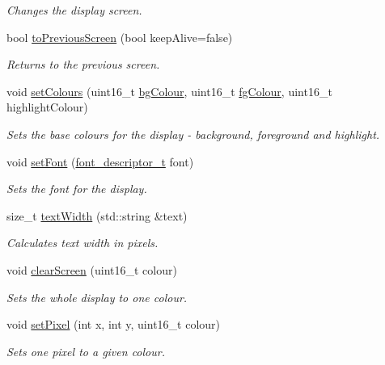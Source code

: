 \begin{DoxyCompactItemize}
\begin{DoxyCompactList}\small\item\em Changes the display screen. \end{DoxyCompactList}\item 
bool \mbox{\hyperlink{classDisplay_ad043404964c19f51bb903da796aaefda}{to\+Previous\+Screen}} (bool keep\+Alive=false)
\begin{DoxyCompactList}\small\item\em Returns to the previous screen. \end{DoxyCompactList}\item 
void \mbox{\hyperlink{classDisplay_a8292ad87dddbf7090e074bcff5968d93}{set\+Colours}} (uint16\+\_\+t \mbox{\hyperlink{classDisplay_a23a0f9867d7ba82c45a3c612c84e0504}{bg\+Colour}}, uint16\+\_\+t \mbox{\hyperlink{classDisplay_aa6a2bd6e8f05a0794ff6b32c30723245}{fg\+Colour}}, uint16\+\_\+t highlight\+Colour)
\begin{DoxyCompactList}\small\item\em Sets the base colours for the display -\/ background, foreground and highlight. \end{DoxyCompactList}\item 
void \mbox{\hyperlink{classDisplay_afb2154f5edc1c2784ef43d0ddae9cd6d}{set\+Font}} (\mbox{\hyperlink{structfont__descriptor__t}{font\+\_\+descriptor\+\_\+t}} font)
\begin{DoxyCompactList}\small\item\em Sets the font for the display. \end{DoxyCompactList}\item 
size\+\_\+t \mbox{\hyperlink{classDisplay_a60f87a87dc86ca281c1095de69e981e6}{text\+Width}} (std\+::string \&text)
\begin{DoxyCompactList}\small\item\em Calculates text width in pixels. \end{DoxyCompactList}\item 
void \mbox{\hyperlink{classDisplay_a905f9f783556b52da4655c541a5e3ea0}{clear\+Screen}} (uint16\+\_\+t colour)
\begin{DoxyCompactList}\small\item\em Sets the whole display to one colour. \end{DoxyCompactList}\item 
void \mbox{\hyperlink{classDisplay_a34d1063149dc9f36c43afd5066b0b3ce}{set\+Pixel}} (int x, int y, uint16\+\_\+t colour)
\begin{DoxyCompactList}\small\item\em Sets one pixel to a given colour. \end{DoxyCompactList}\item 

\end{DoxyCompactItemize}
